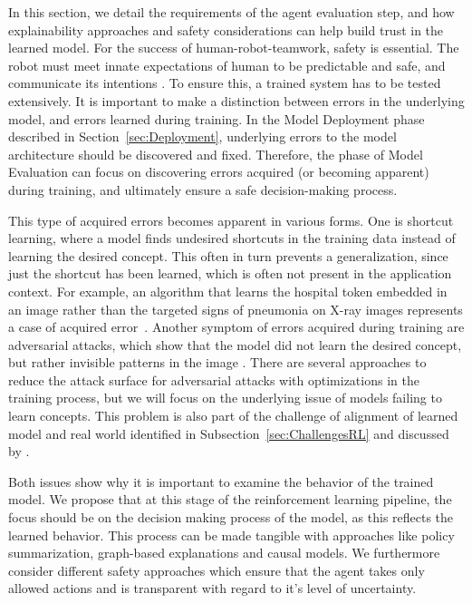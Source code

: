 \documentclass[twoside,11pt]{article}
\begin{document}
\begin{enumerate}
In this section, we detail the requirements of the agent evaluation step, and how explainability approaches and safety considerations can help build trust in the learned model. For the success of human-robot-teamwork, safety is essential. The robot must meet innate expectations of human to be predictable and safe, and communicate its intentions \citep{EderHarperLeonards:2014:HITLRoboticsSafetyAssurance}. To ensure this, a trained system has to be tested extensively. It is important to make a distinction between errors in the underlying model, and errors learned during training. In the Model Deployment phase described in Section~\ref{sec:Deployment}, underlying errors to the model architecture should be discovered and fixed. Therefore, the phase of Model Evaluation can focus on discovering errors acquired (or becoming apparent) during training, and ultimately ensure a safe decision-making process.

This type of acquired errors becomes apparent in various forms. One is shortcut learning, where a model finds undesired shortcuts in the training data instead of learning the desired concept. This often in turn prevents a generalization, since just the shortcut has been learned, which is often not present in the application context. For example, an algorithm that learns the hospital token embedded in an image rather than the targeted signs of pneumonia on X-ray images represents a case of acquired error~\citep{GeirhosEtAl:2020:ShortcutLearningDNN}. 
Another symptom of errors acquired during training are adversarial attacks, which show that the model did not learn the desired concept, but rather invisible patterns in the image \citep{GoodfellowShlensSzegedy:2014:AdversarialExamples}. There are several approaches to reduce the attack surface for adversarial attacks with optimizations in the training process, but we will focus on the underlying issue of models failing to learn concepts. This problem is also part of the challenge of alignment of learned model and real world identified in Subsection~\ref{sec:ChallengesRL} and discussed by \citet{RoyEtAl:2021:RLRoboticsChallenges}.

Both issues show why it is important to examine the behavior of the trained model. We propose that at this stage of the reinforcement learning pipeline, the focus should be on the decision making process of the model, as this reflects the learned behavior. This process can be made tangible with approaches like policy summarization, graph-based explanations and causal models. We furthermore consider different safety approaches which ensure that the agent takes only allowed actions and is transparent with regard to it's level of uncertainty.


\end{enumerate}
\end{document}
